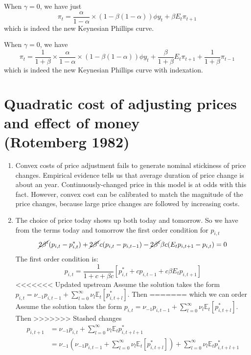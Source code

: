 \documentclass[11pt]{amsart}
\begin{document}
When $\gamma = 0$, we have just
\[
\pi_t =  \frac{\alpha}{1-\alpha} \times (1 - \beta (1-\alpha)) \phi  y_t +  \beta E_t \pi_{t+1} 
\]
which is indeed the new Keynesian Phillips curve.

When $\gamma = 0$, we have 
\[
\pi_t = \frac{1}{1 + \beta}  \times \frac{\alpha}{1-\alpha} \times (1 - \beta (1-\alpha)) \phi y_t + \frac{\beta}{1 + \beta}E_t \pi_{t+1} +  \frac{1}{1 + \beta} \pi_{t-1}
\]
which is indeed the new Keynesian Phillips curve with indexation.

\section{Quadratic cost of adjusting prices and effect of money \\ (Rotemberg 1982)}
\begin{enumerate}[label = (\alph*)]
	\item Convex costs of price adjustment fails to generate nominal stickiness of price changes. 
	Empirical evidence tells us that average duration of price change is about an year. 
	Continuously-changed price in this model is at odds with this fact. 
	However, convex cost can be calibrated to match the magnitude of the price changes, because large price changes are followed by increasing costs.

	\item 
	The choice of price today shows up both today and tomorrow. 
	So we have from the terms today and tomorrow the first order condition for $p_{i,t}$
	\[
	\cancel{2 \beta^t} (p_{i,t} - p_{i,t}^*) + \cancel{2 \beta^t} c (p_{i,t} - p_{i,t-1}) - \cancel{2 \beta^t} \beta c (E_t p_{i,t+1} - p_{i,t}) = 0
	\]
	The first order condition is: 
	\begin{equation*}
    p_{i,t} = \frac{1}{1 + c + \beta c} \left[ p_{i,t}^{*} + c p_{i,t-1} + c \beta E_t p_{i,t+1} \right]
	\end{equation*}
<<<<<<< Updated upstream
	Assume the solution takes the form $p_{i,t} = \nu_{-1} p_{i,t-1} + \sum_{l=0}^{\infty}\nu_l \mathbb{E}_t [p_{i,t+l}^{*}]$.
	Then
=======
	which we can order 
	Assume the solution takes the form $p_{i,t} = \nu_{-1} p_{i,t-1} + \sum_{l=0}^{\infty}\nu_l \mathbb{E}_t [p_{i,t+l}^{*}]$. Then
>>>>>>> Stashed changes
	\begin{align*}
	p_{i,t+1} &= \nu_{-1} p_{i,t} + \sum_{l=0}^{\infty} \nu_l \mathbb{E}_t p_{i,t+l+1}^{*} \\
	& = \nu_{-1} \left( \nu_{-1} p_{i,t-1} + \sum_{l=0}^{\infty}\nu_l \mathbb{E}_t [p_{i,t+l}^{*}] \right)+ \sum_{l=0}^{\infty} \nu_l \mathbb{E}_t p_{i,t+l+1}^{*}
	\end{align*}
	

\end{enumerate}
\end{document}
